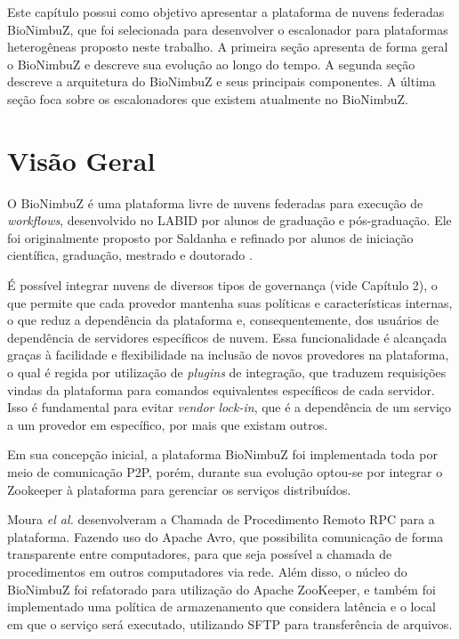 Este capítulo possui como objetivo apresentar a plataforma de nuvens federadas BioNimbuZ, que foi selecionada para desenvolver o escalonador para plataformas heterogêneas proposto neste trabalho. A primeira seção apresenta de forma geral o BioNimbuZ e descreve sua evolução ao longo do tempo. A segunda seção descreve a arquitetura do BioNimbuZ e seus principais componentes. A última seção foca sobre os escalonadores que existem atualmente no BioNimbuZ.

\section{Visão Geral}

O BioNimbuZ é uma plataforma livre de nuvens federadas para execução de \textit{workflows}, desenvolvido no \acrfull{LABID} por alunos de graduação e pós-graduação. Ele foi originalmente proposto por Saldanha\cite{Saldanha_BioNimbus} e refinado por alunos de iniciação científica, graduação, mestrado e doutorado\cite{BioNimbuZ_Breno_Deric} \cite{BioNimbuZ_6846526} \cite{6732620_BioNimbuZ_ACOsched} \cite{BioNimbuZ_Willian_C99} \cite{closer12_BioNimbuZ_AHP} \cite{BioNimbuZ_Vegara}.

É possível integrar nuvens de diversos tipos de governança (vide Capítulo 2), o que permite que cada provedor mantenha suas políticas e características internas, o que reduz a dependência da plataforma e, consequentemente, dos usuários de dependência de servidores específicos de nuvem. Essa funcionalidade é alcançada graças à facilidade e flexibilidade na inclusão de novos provedores na plataforma, o qual é regida por utilização de \textit{plugins} de integração, que traduzem requisições vindas da plataforma para comandos equivalentes específicos de cada servidor. Isso é fundamental para evitar \textit{vendor lock-in}\cite{VendorLockInDef}, que é a dependência de um serviço a um provedor em específico, por mais que existam outros.

Em sua concepção inicial, a plataforma BioNimbuZ foi implementada toda por meio de comunicação \acrfull{P2P}, porém, durante sua evolução optou-se por integrar o Zookeeper\cite{Zookeeper} à plataforma para gerenciar os serviços distribuídos. %

Moura \textit{el al.}\cite{BioNimbuZ_6846526} desenvolveram a Chamada de Procedimento Remoto \acrshort{RPC}\cite{RPC_1701928} para a plataforma. Fazendo uso do Apache Avro\cite{Avro}, que possibilita comunicação de forma transparente entre computadores, para que seja possível a chamada de procedimentos em outros computadores via rede. Além disso, o núcleo do BioNimbuZ foi refatorado para utilização do Apache ZooKeeper\cite{Zookeeper}, e também foi implementado uma política de armazenamento que considera latência e o local em que o serviço será executado, utilizando \acrfull{SFTP} para transferência de arquivos.

